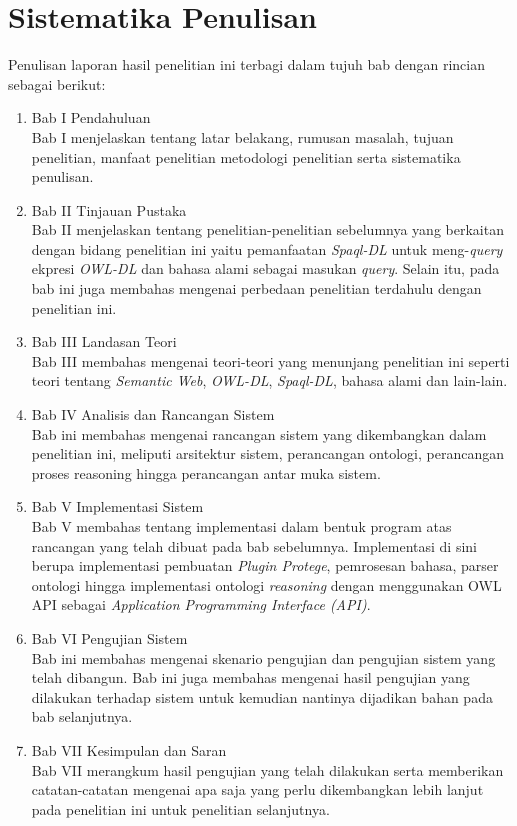 \section{Sistematika Penulisan}
Penulisan laporan hasil penelitian ini terbagi dalam tujuh bab dengan rincian sebagai berikut:
\begin{enumerate}
	\item Bab I Pendahuluan\\
	Bab I menjelaskan tentang latar belakang, rumusan masalah, tujuan penelitian, manfaat penelitian metodologi penelitian serta sistematika penulisan.
	\item Bab II Tinjauan Pustaka\\
	Bab II menjelaskan tentang penelitian-penelitian sebelumnya yang berkaitan dengan bidang penelitian ini yaitu pemanfaatan \emph{Spaql-DL} untuk meng-\emph{query} ekpresi \emph{OWL-DL} dan bahasa alami sebagai masukan \emph{query}. Selain itu, pada bab ini juga membahas mengenai perbedaan penelitian terdahulu dengan penelitian ini.
	\item Bab III Landasan Teori\\
	Bab III membahas mengenai teori-teori yang menunjang penelitian ini seperti teori tentang \emph{Semantic Web}, \emph{OWL-DL}, \emph{Spaql-DL}, bahasa alami dan lain-lain.
	\item Bab IV Analisis dan Rancangan Sistem\\
	Bab ini membahas mengenai rancangan sistem yang dikembangkan dalam penelitian ini, meliputi arsitektur sistem, perancangan ontologi, perancangan proses reasoning hingga perancangan antar muka sistem.
	\item Bab V Implementasi Sistem\\
	Bab V membahas tentang implementasi dalam bentuk program atas rancangan yang telah dibuat pada bab sebelumnya. Implementasi di sini berupa implementasi pembuatan \emph{Plugin Protege}, pemrosesan bahasa, parser ontologi hingga implementasi ontologi \emph{reasoning} dengan menggunakan OWL API sebagai \emph{Application Programming Interface (API)}.
	\item Bab VI Pengujian Sistem\\
	Bab ini membahas mengenai skenario pengujian dan pengujian sistem yang telah dibangun. Bab ini juga membahas mengenai hasil pengujian yang dilakukan terhadap sistem untuk kemudian nantinya dijadikan bahan pada bab selanjutnya.
	\item Bab VII Kesimpulan dan Saran\\
	Bab VII merangkum hasil pengujian yang telah dilakukan serta memberikan catatan-catatan mengenai apa saja yang perlu dikembangkan lebih lanjut pada penelitian ini untuk penelitian selanjutnya.
\end{enumerate}